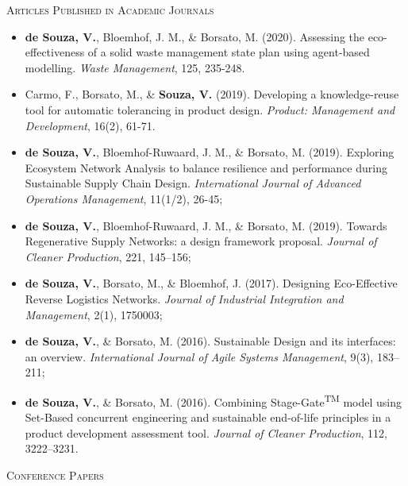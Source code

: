 \faBook
\vspace{5pt}

\textsc{Articles Published in Academic Journals}

	{\begin{itemize}
	    \item \textbf{de Souza, V.}, Bloemhof, J. M., \& Borsato, M. (2020). Assessing the eco-effectiveness of a solid waste management state plan using agent-based modelling. \textit{Waste Management}, 125, 235-248.
	    \item Carmo, F., Borsato, M., \& \textbf{Souza, V.} (2019). Developing a knowledge-reuse tool for automatic tolerancing in product design. \textit{Product: Management and Development}, 16(2), 61-71.
	    \item \textbf{de Souza, V.}, Bloemhof-Ruwaard, J. M., \& Borsato, M. (2019). Exploring Ecosystem Network Analysis to balance resilience and performance during Sustainable Supply Chain Design. \textit{International Journal of Advanced Operations Management}, 11(1/2), 26-45;
	    \item \textbf{de Souza, V.}, Bloemhof-Ruwaard, J. M., \& Borsato, M. (2019). Towards Regenerative Supply Networks: a design framework proposal. \textit{Journal of Cleaner Production}, 221, 145–156;
        \item \textbf{de Souza, V.}, Borsato, M., \& Bloemhof, J. (2017). Designing Eco-Effective Reverse Logistics Networks. \textit{Journal of Industrial Integration and Management}, 2(1), 1750003;
        \item \textbf{de Souza, V.}, \& Borsato, M. (2016). Sustainable Design and its interfaces: an overview. \textit{International Journal of Agile Systems Management}, 9(3), 183–211;
        \item \textbf{de Souza, V.}, \& Borsato, M. (2016). Combining Stage-Gate\textsuperscript{TM} model using Set-Based concurrent engineering and sustainable end-of-life principles in a product development assessment tool. \textit{Journal of Cleaner Production}, 112, 3222–3231.
    \end{itemize}}

\textsc{Conference Papers}

